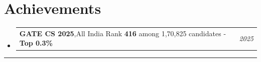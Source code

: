 \documentclass[a4paper,11pt]{article}
\makeatletter
\newcommand{\resumePOR}[3]{
  \vspace{0.5mm}\item
  \begin{tabular*}{0.97\textwidth}[t]{l@{\extracolsep{\fill}}r}
    \textbf{#1},\hspace{0.3mm}#2 & \textit{\small{#3}}
  \end{tabular*}
  \vspace{-3mm}
}
\newcommand{\resumeSubHeadingListStart}{\begin{itemize}[leftmargin=*,labelsep=0mm]}
\newcommand{\resumeSubHeadingListEnd}{\end{itemize}\vspace{1mm}}
\makeatother
\begin{document}
\section{Achievements}
\vspace{-1.7mm}
\resumeSubHeadingListStart
\resumePOR{GATE CS 2025}{All India Rank \textbf{416} among 1,70,825 candidates - \textbf{Top 0.3\%} }{2025}
\resumeSubHeadingListEnd
\hspace*{-5mm}\rule{1.035\textwidth}{0.1mm}
\end{document}
